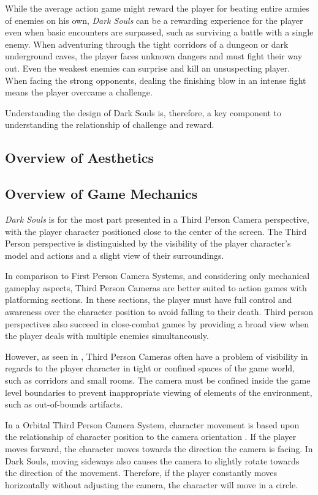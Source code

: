 While the average action game might reward the player for beating entire armies of enemies on his own, \emph{Dark Souls} can be a rewarding experience for the player even when basic encounters are surpassed, such as surviving a battle with a single enemy. When adventuring through the tight corridors of a dungeon or dark underground caves, the player faces unknown dangers and must fight their way out. Even the weakest enemies can surprise and kill an unsuspecting player. When facing the strong opponents, dealing the finishing blow in an intense fight means the player overcame a challenge.

Understanding the design of Dark Souls is, therefore, a key component to understanding the relationship of challenge and reward.

\subsection{Overview of Aesthetics}

\subsection{Overview of Game Mechanics}

\emph{Dark Souls} is for the most part presented in a Third Person Camera perspective, with the player character positioned close to the center of the screen. The Third Person perspective is distinguished by the visibility of the player character's model and actions and a slight view of their surroundings.

In comparison to First Person Camera Systems, and considering only mechanical gameplay aspects, Third Person Cameras are better suited to action games with platforming sections. In these sections, the player must have full control and awareness over the character position to avoid falling to their death. Third person perspectives also succeed in close-combat games by providing a broad view when the player deals with multiple enemies simultaneously.

However, as seen in \cite{BOOK_LevelUpTheGuideToGreat}, Third Person Cameras often have a problem of visibility in regards to the player character in tight or confined spaces of the game world, such as corridors and small rooms. The camera must be confined inside the game level boundaries to prevent inappropriate viewing of elements of the environment, such as  out-of-bounds artifacts.

In a Orbital Third Person Camera System, character movement is based upon the relationship of character position to the camera orientation \cite{BOOK_RealTimeCameras}. If the player moves forward, the character moves towards the direction the camera is facing. In Dark Souls, moving sideways also causes the camera to slightly rotate towards the direction of the movement. Therefore, if the player constantly moves horizontally without adjusting the camera, the character will move in a circle.

